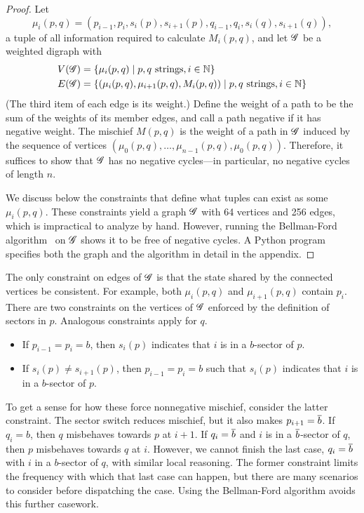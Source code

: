 \begin{proof}
Let
\[
  \mu_i(p,q) = (p_{i-1},p_i,s_i(p),s_{i+1}(p),q_{i-1},q_i,s_i(q),s_{i+1}(q)),
\]
a tuple of all information required to calculate $M_i(p,q)$, and let $\mathscr{G}$ be a
weighted digraph with
\begin{align*}
  \V[\G] &= \set{\mu_i(p,q)}{p,q \text{ strings}, i \in \nats} \\
  \E[\G] &= \set{(\mu_i(p,q),\mu_{i+1}(p,q),M_i(p,q))}{p,q \text{ strings}, i
    \in \nats}
\end{align*}
(The third item of each edge is its weight.) Define the weight of a path to be
the sum of the weights of its member edges, and call a path negative if it has
negative weight. The mischief $M(p,q)$ is the weight of a path in $\mathscr{G}$ induced
by the sequence of vertices $(\mu_0(p,q), \dots, \mu_{n-1}(p,q),
\mu_0(p,q))$. Therefore, it suffices to show that $\mathscr{G}$ has no negative
cycles---in particular, no negative cycles of length $n$.

We discuss below the constraints that define what tuples can exist as some
$\mu_i(p,q)$. These constraints yield a graph $\mathscr{G}$ with 64 vertices and 256
edges, which is impractical to analyze by hand. However, running the
Bellman-Ford algorithm~\cite{bellmanford} on $\mathscr{G}$ shows it to be free of
negative cycles. A Python program specifies both the graph and the algorithm in
detail in the appendix.
\end{proof}

The only constraint on edges of $\mathscr{G}$ is that the state shared by the connected
vertices be consistent. For example, both $\mu_i(p,q)$ and $\mu_{i+1}(p,q)$
contain $p_i$. There are two constraints on the vertices of $\mathscr{G}$ enforced by
the definition of sectors in $p$. Analogous constraints apply for $q$.
\begin{itemize}
\item If $p_{i-1} = p_i = b$, then $s_i(p)$ indicates that $i$ is in a
  $b$-sector of $p$.
\item If $s_i(p) \neq s_{i+1}(p)$, then $p_{i-1} = p_i = b$ such that $s_i(p)$
  indicates that $i$ is in a $b$-sector of $p$.
\end{itemize}
To get a sense for how these force nonnegative mischief, consider the latter
constraint. The sector switch reduces mischief, but it also makes $p_{i+1} =
\overline{b}$. If $q_i = b$, then $q$ misbehaves towards $p$ at $i+1$. If $q_i =
\overline{b}$ and $i$ is in a $\overline{b}$-sector of $q$, then $p$ misbehaves towards $q$
at $i$. However, we cannot finish the last case, $q_i = \overline{b}$ with $i$ in a
$b$-sector of $q$, with similar local reasoning. The former constraint limits
the frequency with which that last case can happen, but there are many
scenarios to consider before dispatching the case. Using the Bellman-Ford
algorithm avoids this further casework.

